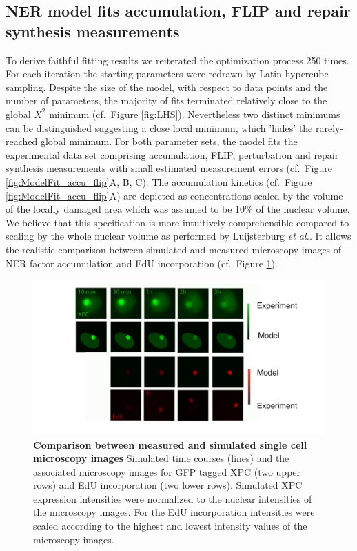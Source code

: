 \subsection{NER model fits accumulation, FLIP and repair synthesis measurements}    

To derive faithful fitting results we reiterated the optimization process 250 times. For each iteration the starting parameters were redrawn by Latin hypercube sampling. Despite the size of the model, with respect to data points and the number of parameters, the majority of fits terminated relatively close to the global $X^2$ minimum (cf.\ Figure \ref{fig:LHS}). Nevertheless two distinct minimums can be distinguished suggesting a close local minimum, which 'hides' the rarely-reached global minimum. For both parameter sets, the model fits the experimental data set comprising accumulation, FLIP, perturbation and repair synthesis measurements with small estimated measurement errors (cf.\ Figure \ref{fig:ModelFit_accu_flip}A, B, C). The accumulation kinetics (cf.\ Figure \ref{fig:ModelFit_accu_flip}A) are depicted as concentrations scaled by the volume of the locally damaged area which was assumed to be 10\% of the nuclear volume. We believe that this specification is more intuitively comprehensible  compared to scaling by the whole nuclear volume as performed by Luijsterburg \textit{et al.}\cite{Luijsterburg2010}. It allows the realistic comparison between simulated and measured microscopy images of NER factor accumulation and EdU incorporation (cf.\ Figure \ref{fig:Fitt_accu_Mic}).  

\begin{figure}[htbp]
\begin{center}
\includegraphics[width=1\textwidth]{Abbildungen/figure2_6_2.pdf}
\caption{\textbf{Comparison between measured and simulated single cell microscopy images} Simulated time courses (lines) and the associated microscopy images for GFP tagged XPC (two upper rows) and EdU incorporation (two lower rows). Simulated XPC expression intensities were normalized to the nuclear intensities of the microscopy images. For the EdU incorporation intensities were scaled according to the highest and lowest intensity values of the microscopy images.}
\label{fig:Fitt_accu_Mic}
\end{center}
\end{figure}

